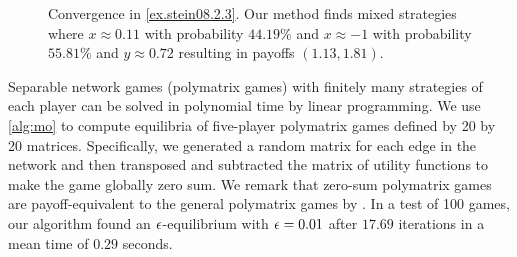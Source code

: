 \begin{example}
\begin{figure}
     \caption{Convergence in \cref{ex.stein08.2.3}. Our method finds mixed strategies where $x\approx0.11$ with probability $44.19\%$ and $x\approx-1$ with probability $55.81\%$ and $y\approx0.72$ resulting in payoffs \((1.13, 1.81)\).}
    \end{figure}
\end{example}

\begin{example}\label{exsep}
  Separable network games (polymatrix games) with finitely many strategies of each player can be solved in polynomial time \cite{Cai16} by linear programming. We use \cref{alg:mo} to compute equilibria of five-player polymatrix games defined by 20 by 20 matrices. Specifically, we generated a random matrix for each edge in the network and then transposed and subtracted the matrix of utility functions to make the game globally zero sum. We remark that zero-sum polymatrix games are payoff-equivalent to the general polymatrix games by \cite[Theorem 7]{Cai16}. In a test of 100 games, our algorithm found an $\epsilon$-equilibrium with $\epsilon = 0.01$ after $17.69$ iterations in a mean time of $0.29$ seconds.
\end{example}

